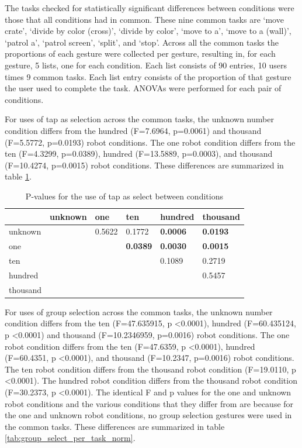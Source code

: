 The tasks checked for statistically significant differences between conditions were those that all conditions had in common. 
These nine common tasks are `move crate', `divide by color (cross)', `divide by color', `move to a', `move to a (wall)', `patrol a', `patrol screen', `split', and `stop'. 
Across all the common tasks the proportions of each gesture were collected per gesture, resulting in, for each gesture, 5 lists, one for each condition. Each list consists of 90 entries, 10 users times 9 common tasks. Each list entry consists of the proportion of that gesture the user used to complete the task. ANOVAs were performed for each pair of conditions. 

For uses of tap as selection across the common tasks, the unknown number condition differs from the hundred (F=7.6964, p=0.0061) and thousand (F=5.5772, p=0.0193) robot conditions. 
The one robot condition differs from the ten (F=4.3299, p=0.0389), hundred (F=13.5889, p=0.0003), and thousand (F=10.4274, p=0.0015) robot conditions.
These differences are summarized in table \ref{tab:tap_select_per_task_norm}.

\begin{table}
	\begin{tabular}{l|l l l l l}
		& unknown & one    & ten        & hundred     & thousand   \\ 
		\hline
		unknown & & 0.5622 & 0.1772 & \textbf{0.0006} & \textbf{0.0193} \\   
		one & & & \textbf{0.0389} & \textbf{0.0030} & \textbf{0.0015} \\
		ten & & & & 0.1089 & 0.2719   \\
		hundred & & & & & 0.5457   \\
		thousand & & & & &\\
	\end{tabular}
	\caption{P-values for the use of tap as select between conditions}
	\label{tab:tap_select_per_task_norm}
\end{table}

For uses of group selection across the common tasks, the unknown number condition differs from the ten (F=47.635915, p \textless 0.0001), hundred (F=60.435124, p \textless 0.0001) and thousand (F=10.2346959, p=0.0016) robot conditions. 
The one robot condition differs from the ten (F=47.6359, p \textless 0.0001), hundred (F=60.4351, p \textless 0.0001), and thousand (F=10.2347, p=0.0016) robot conditions.
The ten robot condition differs from the thousand robot condition (F=19.0110, p \textless 0.0001).
The hundred robot condition differs from the thousand robot condition (F=30.2373, p \textless 0.0001).
The identical F and p values for the one and unknown robot conditions and the various conditions that they differ from are because for the one and unknown robot conditions, no group selection gestures were used in the common tasks. 
These differences are summarized in table \ref{tab:group_select_per_task_norm}.

